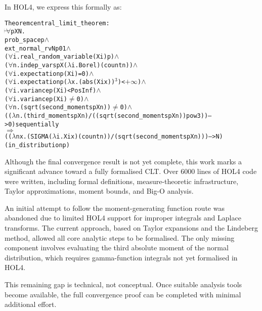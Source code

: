 In HOL4, we express this formally as:

\begin{center}
\scriptsize
\begin{hol}
\begin{alltt}
Theorem central\_limit\_theorem :
\(\!\!\!{\turn}\!\!\!\!\) \(\forall\)p X N.
prob\_space p \(\land\)
ext\_normal\_rv N p 0 1 \(\land\)
(\(\forall\)i. real\_random\_variable (X i) p) \(\land\)
(\(\forall\)n. indep\_vars p X (\(\lambda\)i. Borel) (count n)) \(\land\)
(\(\forall\)i. expectation p (X i) = 0) \(\land\)
(\(\forall\)i. expectation p (\(\lambda\)x. (abs (X i x))\(^3\)) < \(+\infty\)) \(\land\)
(\(\forall\)i. variance p (X i) < PosInf) \(\land\)
(\(\forall\)i. variance p (X i) \(\ne\) 0) \(\land\)
(\(\forall\)n. (sqrt (second\_moments p X n)) \(\ne\) 0) \(\land\)
((\(\lambda\)n. (third\_moments p X n) / ((sqrt (second\_moments p X n)) pow 3)) --> 0) sequentially
\(\Rightarrow\)
((\(\lambda\)n x. (SIGMA (\(\lambda\)i. X i x) (count n)) / (sqrt (second\_moments p X n))) --> N)
(in\_distribution p)
\end{alltt}
\end{hol}
\end{center}

Although the final convergence result is not yet complete, this work marks a significant advance toward a fully formalised CLT. Over 6000 lines of HOL4 code were written, including formal definitions, measure-theoretic infrastructure, Taylor approximations, moment bounds, and Big-O analysis.

An initial attempt to follow the moment-generating function route was abandoned due to limited HOL4 support for improper integrals and Laplace transforms. The current approach, based on Taylor expansions and the Lindeberg method, allowed all core analytic steps to be formalised. The only missing component involves evaluating the third absolute moment of the normal distribution, which requires gamma-function integrals not yet formalised in HOL4.

This remaining gap is technical, not conceptual. Once suitable analysis tools become available, the full convergence proof can be completed with minimal additional effort.
